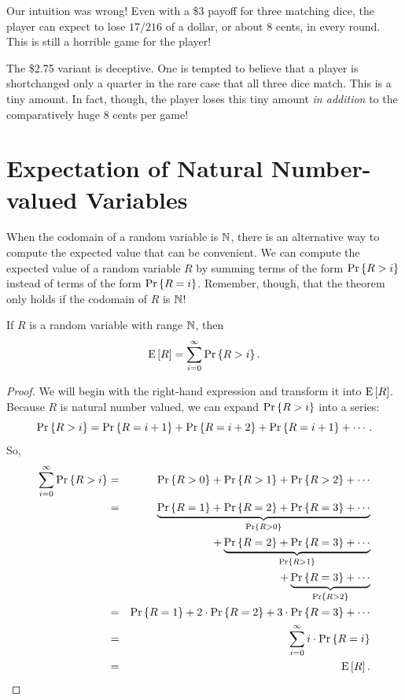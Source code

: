 \documentclass[11pt,twoside]{article}
\begin{document}
Our intuition was wrong!  Even with a \$3 payoff for three matching
dice, the player can expect to lose $17/216$ of a dollar, or
about 8 cents, in every round.  This is still a horrible game for the
player!

The \$2.75 variant is deceptive.  One is tempted to believe that a
player is shortchanged only a quarter in the rare case that all three
dice match.  This is a tiny amount.  In fact, though, the player loses
this tiny amount {\em in addition} to the comparatively huge 8 cents
per game!

\section{Expectation of Natural Number-valued Variables}

When the codomain of a random variable is $\naturals$, there is an
alternative way to compute the expected value that can be convenient.  We
can compute the expected value of a random variable $R$ by summing terms
of the form $\pr{R > i}$ instead of terms of the form $\pr{R = i}$.
Remember, though, that the theorem only holds if the codomain of $R$ is
$\naturals$!


\begin{theorem}\label{R>i}
If $R$ is a random variable with range $\naturals$, then
\[
\expect{R} = \sum_{i=0}^{\infty} \pr{R > i}.
\]
\end{theorem}

\begin{proof}
We will begin with the right-hand expression and transform it into
$\expect{R}$.  Because $R$ is natural number valued, we can expand $\pr{R
> i}$ into a series:
\[
\pr{R > i} = \pr{R = i+1} + \pr{R = i+2} + \pr{R = i+1} + \cdots.
\]
So,
\begin{eqnarray*}
\sum_{i=0}^{\infty} \pr{R > i}
        & = & \pr{R > 0} + \pr{R > 1} +  \pr{R > 2} + \cdots \\
        & = & \underbrace{\pr{R = 1} +  \pr{R = 2} + \pr{R = 3} + \cdots}_{\pr{R > 0}} \\
        &   & \qquad\qquad\quad
              +\underbrace{\pr{R = 2} + \pr{R = 3} + \cdots}_{\pr{R > 1}} \notag\\
        &   & \qquad\qquad\qquad\qquad\qquad\quad\,
	      +\underbrace{\pr{R = 3} + \cdots}_{\pr{R > 2}} \notag \\
        & = &  \pr{R = 1} + 2 \cdot \pr{R = 2} + 3 \cdot \pr{R = 3} + \cdots \\
        & = &  \sum_{i=0}^{\infty} i \cdot \pr{R = i} \\
        & = &  \expect{R}.
\end{eqnarray*}

\end{proof}
\end{document}
